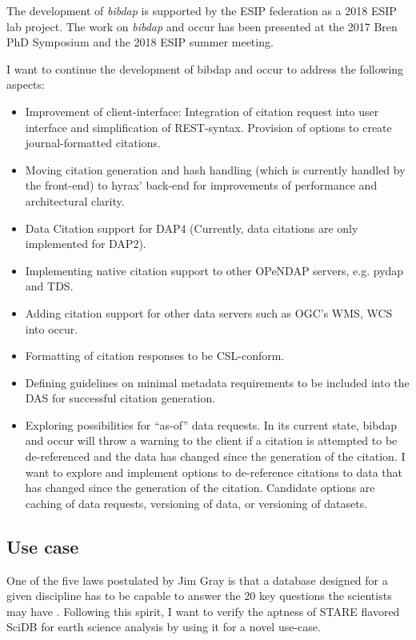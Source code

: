 \documentclass[a4paper,10pt]{article}
\begin{document}
The development of \textit{bibdap} is supported by the \gls{ESIP} federation as a 2018 \gls{ESIP} lab project. The work on \textit{bibdap} and \gls{occur} has been presented at the 2017 Bren PhD Symposium and the 2018 \gls{ESIP} summer meeting.


I want to continue the development of bibdap and occur to address the following aspects:

\begin{itemize}
 \item Improvement of client-interface: Integration of citation request into user interface and simplification of REST-syntax. Provision of options to create journal-formatted citations.
 \item Moving citation generation and hash handling (which is currently handled by the front-end) to hyrax' back-end for improvements of performance and architectural clarity.
 \item Data Citation support for DAP4 (Currently, data citations are only implemented for DAP2).
 \item Implementing native citation support to other OPeNDAP servers, e.g. pydap and \gls{TDS}.
 \item Adding citation support for other data servers such as \gls{OGC}'s \gls{WMS}, \gls{WCS} into \gls{occur}. 
 \item Formatting of citation responses to be \gls{CSL}-conform.
 \item Defining guidelines on minimal metadata requirements to be included into the \gls{DAS} for successful citation generation.
 \item Exploring possibilities for ``as-of'' data requests. In its current state, bibdap and occur will throw a warning to the client if a citation is attempted to be de-referenced and the data has changed since the generation of the citation. I want to explore and implement options to de-reference citations to data that has changed since the generation of the citation. Candidate options are caching of data requests, versioning of data, or versioning of datasets.
\end{itemize}



\newpage


\subsection{Use case}
One of the five laws postulated by Jim Gray is that a database designed for a given discipline has to be capable to answer the 20 key questions the scientists may have \citep{Hey2009, Szalay2009}.
Following this spirit, I want to verify the aptness of STARE flavored SciDB for earth science analysis by using it for a novel use-case.
\end{document}
